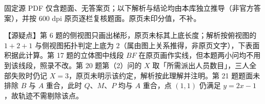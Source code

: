 

\begin{gktip}
固定源 PDF 仅含题面、无答案页；以下解析与结论均由本库独立推导（非官方答案），并按 600 dpi 原页逐栏复核题面。原页未印分值，不补。

【源疑点】第 6 题的侧视图只画出梯形，原页未标其上底长度；解析按俯视图的 $1+2+1$ 与侧视图拓扑判定上底为 $2$（属由图上关系推得，非原页文字），下表面积据此计算。第 17 题的立体图中线段 $BF$ 在原页画作实线，但本题两小问均不用到该线段，照录不改。第 20 题第（2）问的 $X$ 取「所需派出人员数目」，三人全部失败时仍记 $X=3$，原页未明示该约定，解析按此理解并注明。第 21 题题面未排除 $B$ 与 $A$ 重合，此时 $Q$、$M$、$P$ 均与 $A$ 重合，点 $(1,1)$ 仍满足 $y=2x-1$，故轨迹不需剔除该点。
\end{gktip}

